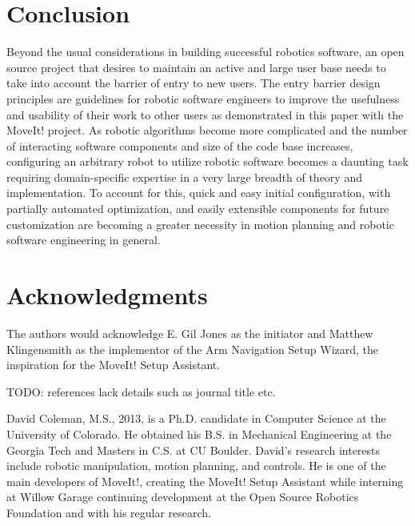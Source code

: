 \documentclass[10pt,journal,compsoc]{joser1}
\begin{document}
{%
\section{Conclusion}
\label{sec::conclusion}

Beyond the usual considerations in building successful robotics software, an open source project that desires to maintain an active and large user base needs to take into account the barrier of entry to new users. The entry barrier design principles are guidelines for robotic software engineers to improve the usefulness and usability of their work to other users as demonstrated in this paper with the MoveIt! project. As robotic algorithms become more complicated and the number of interacting software components and size of the code base increases, configuring an arbitrary robot to utilize robotic software becomes a daunting task requiring domain-specific expertise in a very large breadth of theory and implementation. To account for this, quick and easy initial configuration, with partially automated optimization, and easily extensible components for future customization are becoming a greater necessity in motion planning and robotic software engineering in general. 

\section*{Acknowledgments}
The authors would acknowledge E. Gil Jones as the initiator and Matthew Klingensmith as the implementor of the Arm Navigation Setup Wizard, the inspiration for the MoveIt! Setup Assistant.

TODO: references lack details such as journal title etc. 




\begin{IEEEbiography}[{coleman}]{David Coleman}, M.S., 2013, is a Ph.D. candidate in Computer Science at the University of Colorado. He obtained his B.S. in Mechanical Engineering at the Georgia Tech and Masters in C.S. at CU Boulder. David's research interests include robotic manipulation, motion planning, and controls. He is one of the main developers of MoveIt!, creating the MoveIt! Setup Assistant while interning at Willow Garage continuing development at the Open Source Robotics Foundation and with his regular research.
\end{IEEEbiography}

}
\end{document}
